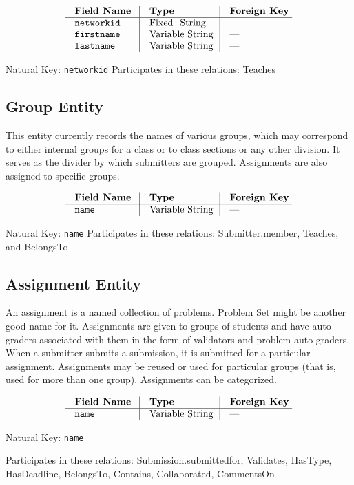$$\vbox{
  \offinterlineskip
  \halign{
    \strut \quad {\tt #}  & \vrule\quad #  & \vrule\quad # \cr
    {\bf Field Name}  & {\bf Type}  & {\bf Foreign Key}\cr
    \noalign{\hrule}    
    networkid  & Fixed String  & --- \cr
    firstname  & Variable String  & --- \cr
    lastname  & Variable String  & --- \cr
  }
}$$

{\noindent\flushleft
Natural Key: {\tt networkid}
Participates in these relations: Teaches}

\subsection{Group Entity}
This entity currently records the names of various groups,
which may correspond to either internal groups for a class
or to class sections or any other division.
It serves as the divider by which submitters are grouped.
Assignments are also assigned to specific groups.

$$\vbox{
  \offinterlineskip
  \halign{
    \strut \quad {\tt #}  & \vrule\quad #  & \vrule\quad # \cr
    {\bf Field Name}  & {\bf Type}  & {\bf Foreign Key}\cr
    \noalign{\hrule}    
    name  & Variable String  & --- \cr
  }
}$$

{\noindent\flushleft
Natural Key: {\tt name}
Participates in these relations: Submitter.member, Teaches, and BelongsTo}

\subsection{Assignment Entity}
An assignment is a named collection of problems.
Problem Set might be another good name for it.
Assignments are given to groups of students and have auto-graders
associated with them in the form of validators and problem auto-graders.
When a submitter submits a submission, 
it is submitted for a particular assignment.
Assignments may be reused or used for particular groups
(that is, used for more than one group). 
Assignments can be categorized.

$$\vbox{
  \offinterlineskip
  \halign{
    \strut \quad {\tt #}  & \vrule\quad #  & \vrule\quad # \cr
    {\bf Field Name}  & {\bf Type}  & {\bf Foreign Key}\cr
    \noalign{\hrule}    
    name  & Variable String  & --- \cr
  }
}$$

{\noindent
Natural Key: {\tt name}\par\noindent
Participates in these relations: Submission.submittedfor, Validates,
HasType, HasDeadline, BelongsTo, Contains, Collaborated, CommentsOn\par}

